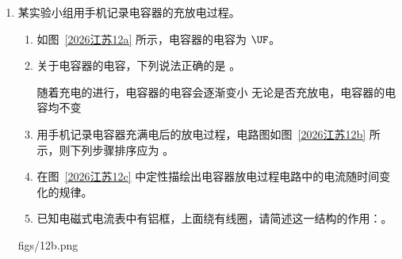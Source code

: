 \documentclass[\gkver]{gaokaozhenti}
\begin{document}
\begin{enumerate}
{正方形相邻边方向垂直，小球拐弯前后速度大小均为 $v$，方向夹角为 $90^{\circ}$，因此动量变化量的大小为：$|\Delta p| = \sqrt{(mv)^{2} + (mv)^{2}} = \sqrt{2}mv = \sqrt{2}p$

可得 $\frac{I}{p} = \sqrt{2}$

结合几何关系，选项中只有 A 符合。

故选 A。
}

\item
某实验小组用手机记录电容器的充放电过程。
\begin{enumerate}
	\item
	如图~\ref{2026江苏12a} 所示，电容器的电容为  $\UF$。
	\item
	关于电容器的电容，下列说法正确的是 。

	{随着充电的进行，电容器的电容会逐渐变小}
	{无论是否充放电，电容器的电容均不变}
	\item
	用手机记录电容器充满电后的放电过程，电路图如图~\ref{2026江苏12b} 所示，则下列步骤排序应为 。

	\item
	在图~\ref{2026江苏12c} 中定性描绘出电容器放电过程电路中的电流随时间变化的规律。
	\item
	已知电磁式电流表中有铝框，上面绕有线圈，请简述这一结构的作用：\newline{}。
\end{enumerate}
{figs/12b.png}
{}
\end{enumerate}
\end{document}
